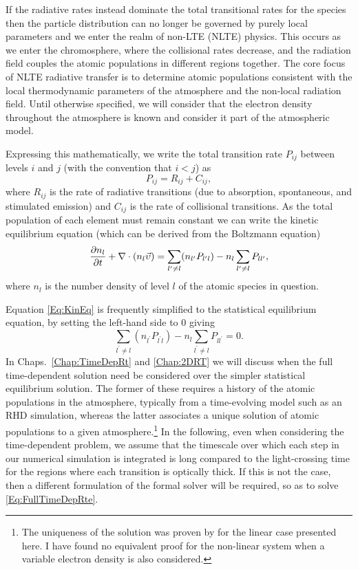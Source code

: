 If the radiative rates instead dominate the total transitional rates for the species then the particle distribution can no longer be governed by purely local parameters and we enter the realm of non-LTE (NLTE) physics.
This occurs as we enter the chromosphere, where the collisional rates decrease, and the radiation field couples the atomic populations in different regions together.
The core focus of NLTE radiative transfer is to determine atomic populations consistent with the local thermodynamic parameters of the atmosphere and the non-local radiation field.
Until otherwise specified, we will consider that the electron density throughout the atmosphere is known and consider it part of the atmospheric model.

Expressing this mathematically, we write the total transition rate $P_{ij}$ between levels $i$ and $j$ (with the convention that $i < j$) as
\begin{equation}
    P_{ij} = R_{ij} + C_{ij},
\end{equation}
where $R_{ij}$ is the rate of radiative transitions (due to absorption, spontaneous, and stimulated emission) and $C_{ij}$ is the rate of collisional transitions.
As the total population of each element must remain constant we can write the kinetic equilibrium equation (which can be derived from the Boltzmann equation)
\begin{equation}
    \frac{\partial n_l}{\partial t} + \nabla \cdot (n_l \vec{\upsilon}) = \sum_{l^\prime\neq l} (n_{l^\prime} P_{l^\prime l}) - n_l \sum_{l^\prime\neq l} P_{ll^\prime},
    \label{Eq:KinEq}
\end{equation}
where $n_l$ is the number density of level $l$ of the atomic species in question.

Equation \eqref{Eq:KinEq} is frequently simplified to the statistical equilibrium equation, by setting the left-hand side to 0 giving
\begin{equation}
\sum_{l^\prime\neq l} (n_{l^\prime} P_{l^\prime l}) - n_l \sum_{l^\prime\neq l} P_{ll^\prime} = 0.
\label{Eq:StatEq}
\end{equation}
In Chaps.~\ref{Chap:TimeDepRt} and \ref{Chap:2DRT} we will discuss when the full time-dependent solution need be considered over the simpler statistical equilibrium solution.
The former of these requires a history of the atomic populations in the atmosphere, typically from a time-evolving model such as an RHD simulation, whereas the latter associates a unique solution of atomic populations to a given atmosphere.\footnote{The uniqueness of the solution was proven by \citet{Rybicki1997} for the linear case presented here. I have found no equivalent proof for the non-linear system when a variable electron density is also considered.}
In the following, even when considering the time-dependent problem, we assume that the timescale over which each step in our numerical simulation is integrated is long compared to the light-crossing time for the regions where each transition is optically thick.
If this is not the case, then a different formulation of the formal solver will be required, so as to solve \eqref{Eq:FullTimeDepRte}.

